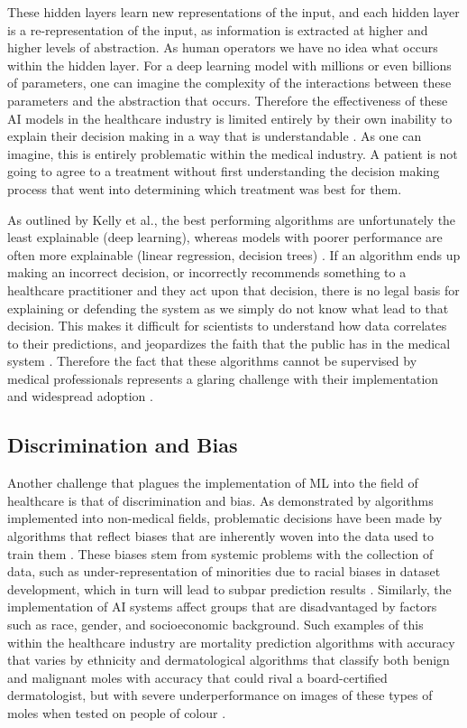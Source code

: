 \documentclass[a4paper]{article}
\begin{document}
These hidden layers learn new representations of the input, and each hidden layer is a re-representation of the input, as information is extracted at higher and higher levels of abstraction. As human operators we have no idea what occurs within the hidden layer. For a deep learning model with millions or even billions of parameters, one can imagine the complexity of the interactions between these parameters and the abstraction that occurs. Therefore the effectiveness of these AI models in the healthcare industry is limited entirely by their own inability to explain their decision making in a way that is understandable \cite{Kelly_2019,Guan_2019}. As one can imagine, this is entirely problematic within the medical industry. A patient is not going to agree to a treatment without first understanding the decision making process that went into determining which treatment was best for them. 

As outlined by Kelly et al., the best performing algorithms are unfortunately the least explainable (deep learning), whereas models with poorer performance are often more explainable (linear regression, decision trees) \cite{Kelly_2019}. If an algorithm ends up making an incorrect decision, or incorrectly recommends something to a healthcare practitioner and they act upon that decision, there is no legal basis for explaining or defending the system as we simply do not know what lead to that decision. This makes it difficult for scientists to understand how data correlates to their predictions, and jeopardizes the faith that the public has in the medical system \cite{Khan_2023}. Therefore the fact that these algorithms cannot be supervised by medical professionals represents a glaring challenge with their implementation and widespread adoption \cite{Murdoch_2021}.

\subsection{Discrimination and Bias}

Another challenge that plagues the implementation of ML into the field of healthcare is that of discrimination and bias. As demonstrated by algorithms implemented into non-medical fields, problematic decisions have been
made by algorithms that reflect biases that are inherently woven into the data used to train them \cite{Char_2018,Khan_2023,Kelly_2019}. These biases stem from systemic problems with the collection of data, such as under-representation of minorities due to racial biases in dataset development, which in turn will lead to subpar prediction results \cite{Khan_2023}. Similarly, 
the implementation of AI systems affect groups that are disadvantaged by factors such as race, gender, and socioeconomic background. Such examples of this within the healthcare industry are mortality prediction algorithms
with accuracy that varies by ethnicity \cite{Chen_2018} and dermatological algorithms that classify both benign and malignant moles with accuracy that could rival a board-certified dermatologist, but with severe underperformance on images of these types of moles when tested on people of colour \cite{esteva_dermatologist-level_2017,Haenssle_2019}.  
\end{document}

